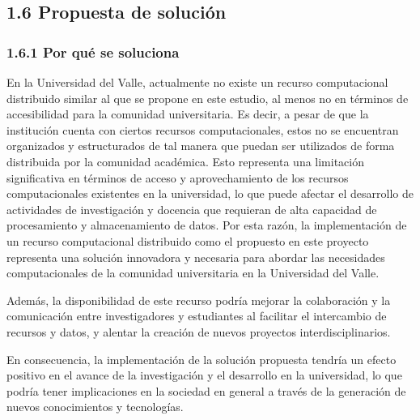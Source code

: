 \begin{spacing}{1.5}
\begin{multicols}{2}
  \subsection{1.6 Propuesta de solución}
  \subsubsection{1.6.1 Por qué se soluciona}

  En la Universidad del Valle, actualmente no existe un recurso computacional distribuido similar al que se propone en este estudio, al menos no en términos de accesibilidad para la comunidad universitaria. Es decir, a pesar de que la institución cuenta con ciertos recursos computacionales, estos no se encuentran organizados y estructurados de tal manera que puedan ser utilizados de forma distribuida por la comunidad académica. Esto representa una limitación significativa en términos de acceso y aprovechamiento de los recursos computacionales existentes en la universidad, lo que puede afectar el desarrollo de actividades de investigación y docencia que requieran de alta capacidad de procesamiento y almacenamiento de datos. Por esta razón, la implementación de un recurso computacional distribuido como el propuesto en este proyecto representa una solución innovadora y necesaria para abordar las necesidades computacionales de la comunidad universitaria en la Universidad del Valle.

  Además, la disponibilidad de este recurso podría mejorar la colaboración y la comunicación entre investigadores y estudiantes al facilitar el intercambio de recursos y datos, y alentar la creación de nuevos proyectos interdisciplinarios.
  
  En consecuencia, la implementación de la solución propuesta tendría un efecto positivo en el avance de la investigación y el desarrollo en la universidad, lo que podría tener implicaciones en la sociedad en general a través de la generación de nuevos conocimientos y tecnologías.


\end{multicols}
\end{spacing}

